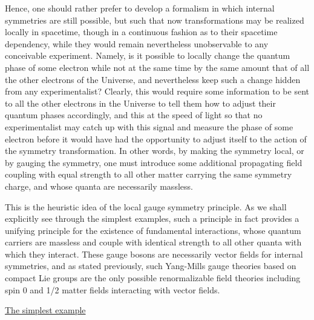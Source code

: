 \documentclass[a4paper,11pt]{article}
\begin{document}
Hence, one should rather prefer to develop a formalism in which internal
symmetries are still possible, but such that now transformations may
be realized locally in spacetime, though in a continuous fashion as
to their spacetime dependency, while they would remain nevertheless
unobservable to any conceivable experiment. Namely, is it possible to
locally change the quantum phase of some electron while not at the same
time by the same amount that of all the other electrons of the Universe,
and nevertheless keep such a change hidden from any experimentalist?
Clearly, this would require some information to be sent to all the
other electrons in the Universe to tell them how to adjust their quantum
phases accordingly, and this at the speed of light so that no experimentalist
may catch up with this signal and measure the phase of some electron before 
it would have had the opportunity to adjust itself to the action of the
symmetry transformation. In other words, by making the symmetry local, or 
by gauging the symmetry, one must introduce some additional propagating 
field coupling with equal strength to all other matter carrying the same 
symmetry charge, and whose quanta are necessarily massless.

This is the heuristic idea of the local gauge symmetry principle.
As we shall explicitly see through the simplest examples, such a principle
in fact provides a unifying principle for the existence of fundamental
interactions, whose quantum carriers are massless and couple with identical
strength to all other quanta with which they interact. These gauge bosons 
are necessarily vector fields for internal symmetries,
and as stated previously, such Yang-Mills gauge theories based on
compact Lie groups are the only possible re\-nor\-ma\-li\-za\-ble field 
theories including spin 0 and 1/2 matter fields interacting with vector fields.

\vspace{10pt}

\noindent\underline{The simplest example}

\vspace{5pt}
\end{document}
